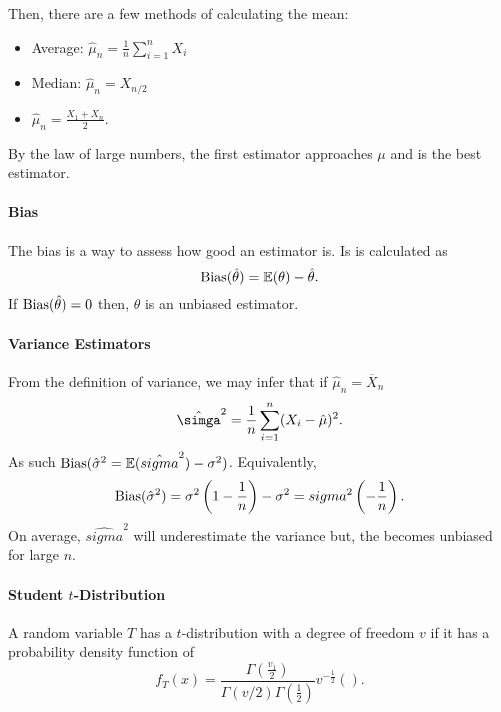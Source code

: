 Then, there are a few methods of calculating the mean:
\begin{itemize}
  \item Average: \(\hat{\mu}_n = \frac{1}{n} \sum_{i=1}^n X_i \)
  \item Median: \(\hat{\mu}_n = X_{n/2}\)
  \item  \(\hat{\mu}_n = \frac{X_1 + X_n}{2}\).
\end{itemize}
By the law of large numbers, the first estimator approaches \(\mu\) and
is the best estimator.

\paragraph{Bias}
The bias is a way to assess how good an estimator is.
Is is calculated as \[
  \mathrm{Bias}(\hat{\theta}) = \mathbb{E}(\theta) - \hat{\theta}
.\] 
If  \(\mathrm{Bias}(\hat{\theta}) = 0\) then, \(\theta\) is an unbiased estimator.

\paragraph{Variance Estimators}
From the definition of variance, we may infer that if \(\hat{\mu}_n = \overline{X}_n\) \[
  \hat{\simga}^2 = \frac{1}{n} \sum_{i=1}^n (X_i - \hat{\mu})^2
.\] 
As such \(\mathrm{Bias}(\hat{\sigma}^2 = \mathbb{E}(\hat{sigma}^2) - \sigma^2)\). Equivalently, \[
  \mathrm{Bias}(\hat{\sigma}^2) = \sigma^2 \left( 1-\frac{1}{n} \right)  - \sigma^2
  = sigma^2\left(  - \frac{1}{n} \right) 
.\] 
On average, \(\hat{sigma}^2\) will underestimate the variance but,
the becomes unbiased for large \(n\).

\paragraph{Student \(t\)-Distribution}
A random variable \(T\) has a \(t\)-distribution with a degree
of freedom  \(v\) if it has a probability density function of \[
  f_T(x) = \frac{\Gamma(\frac{v_1}{2})}{\Gamma(v/2)\Gamma(\frac{1}{2})}
  v^{-\frac{1}{2}} \left(  \right) 
.\] 

